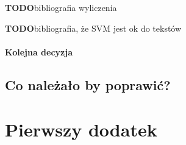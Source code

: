 \documentclass[a4paper,12pt,twoside,openany]{report}
\newcommand{\TODO}{\textbf{TODO}}
\begin{document}
\TODO {bibliografia wyliczenia}

\TODO {bibliografia, że SVM jest ok do tekstów}

\subsubsection{Kolejna decyzja}

\section{Co należało by poprawić?}



\appendix
\chapter{Pierwszy dodatek} 

\begin{thebibliography}{99}

\end{thebibliography}

\zakonczenie  %
\end{document}
